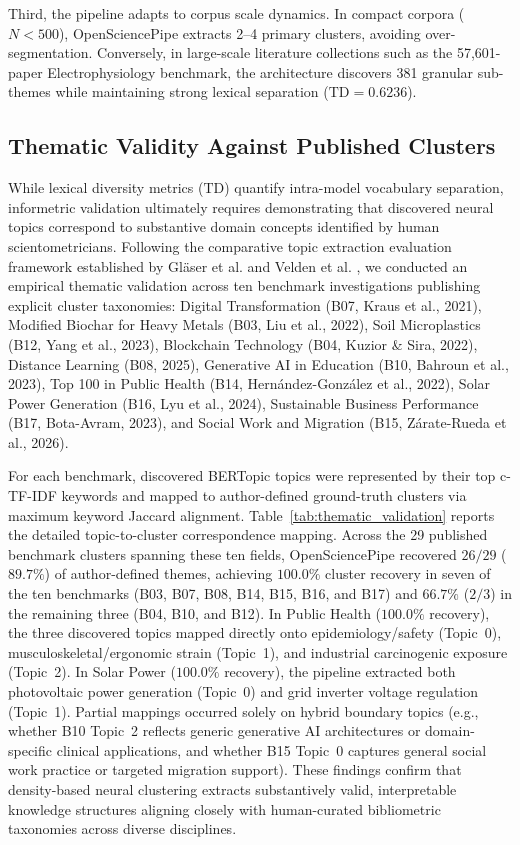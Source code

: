 \documentclass[preprint,12pt]{elsarticle}
\begin{document}
Third, the pipeline adapts to corpus scale dynamics. In compact corpora ($N < 500$), OpenSciencePipe extracts 2--4 primary clusters, avoiding over-segmentation. Conversely, in large-scale literature collections such as the 57,601-paper Electrophysiology benchmark, the architecture discovers 381 granular sub-themes while maintaining strong lexical separation ($\text{TD} = 0.6236$).

\subsection{Thematic Validity Against Published Clusters}
While lexical diversity metrics ($\text{TD}$) quantify intra-model vocabulary separation, informetric validation ultimately requires demonstrating that discovered neural topics correspond to substantive domain concepts identified by human scientometricians. Following the comparative topic extraction evaluation framework established by Gl{\"a}ser et al. \cite{glaser2017same} and Velden et al. \cite{velden2017comparison}, we conducted an empirical thematic validation across ten benchmark investigations publishing explicit cluster taxonomies: Digital Transformation (B07, Kraus et al., 2021), Modified Biochar for Heavy Metals (B03, Liu et al., 2022), Soil Microplastics (B12, Yang et al., 2023), Blockchain Technology (B04, Kuzior \& Sira, 2022), Distance Learning (B08, 2025), Generative AI in Education (B10, Bahroun et al., 2023), Top 100 in Public Health (B14, Hern{\'a}ndez-Gonz{\'a}lez et al., 2022), Solar Power Generation (B16, Lyu et al., 2024), Sustainable Business Performance (B17, Bota-Avram, 2023), and Social Work and Migration (B15, Z{\'a}rate-Rueda et al., 2026).



For each benchmark, discovered BERTopic topics were represented by their top c-TF-IDF keywords and mapped to author-defined ground-truth clusters via maximum keyword Jaccard alignment. Table~\ref{tab:thematic_validation} reports the detailed topic-to-cluster correspondence mapping. Across the 29 published benchmark clusters spanning these ten fields, OpenSciencePipe recovered $26/29$ ($89.7\%$) of author-defined themes, achieving $100.0\%$ cluster recovery in seven of the ten benchmarks (B03, B07, B08, B14, B15, B16, and B17) and $66.7\%$ ($2/3$) in the remaining three (B04, B10, and B12). In Public Health ($100.0\%$ recovery), the three discovered topics mapped directly onto epidemiology/safety (Topic~0), musculoskeletal/ergonomic strain (Topic~1), and industrial carcinogenic exposure (Topic~2). In Solar Power ($100.0\%$ recovery), the pipeline extracted both photovoltaic power generation (Topic~0) and grid inverter voltage regulation (Topic~1). Partial mappings occurred solely on hybrid boundary topics (e.g., whether B10 Topic~2 reflects generic generative AI architectures or domain-specific clinical applications, and whether B15 Topic~0 captures general social work practice or targeted migration support). These findings confirm that density-based neural clustering extracts substantively valid, interpretable knowledge structures aligning closely with human-curated bibliometric taxonomies across diverse disciplines.
\end{document}
